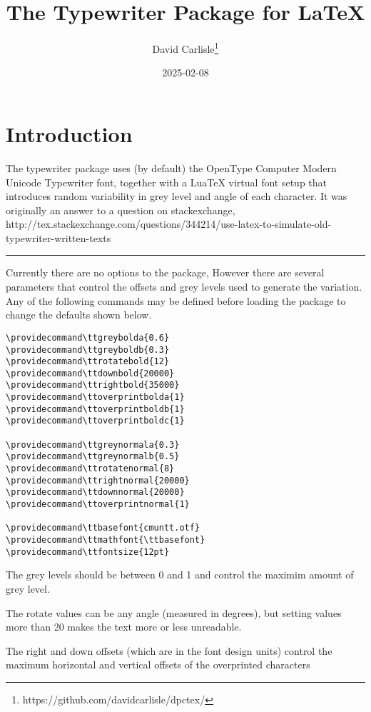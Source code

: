 \documentclass{article}
\providecommand\ttbasefont{QTAntiquePost.otf}
\providecommand\ttmathfont{cmuntt.otf}
\providecommand\ttoverprintnormal{0}
\providecommand\ttoverprintbolda{1}
\providecommand\ttoverprintboldb{0}
\providecommand\ttoverprintboldc{0}
\providecommand\ttgreynormala{0.5}
\begin{document}
\title{The Typewriter Package for LaTeX}
\author{David Carlisle\thanks{https://github.com/davidcarlisle/dpctex/}}
\date{2025-02-08}

\maketitle

\section{Introduction}
The typewriter package uses (by default) the OpenType Computer Modern Unicode
Typewriter font, together with a LuaTeX virtual font setup that
introduces random variability in grey level and angle of each
character. It was originally an answer to a question on stackexchange,
http://tex.stackexchange.com/questions/344214/use-latex-to-simulate-old-typewriter-written-texts


\hrule

Currently there are no options to the package, However there are several parameters that control the offsets
and grey levels used to generate the variation. Any of the following
commands may be defined before loading the package to change the defaults shown below.

\begin{verbatim}
\providecommand\ttgreybolda{0.6}
\providecommand\ttgreyboldb{0.3}
\providecommand\ttrotatebold{12}
\providecommand\ttdownbold{20000}
\providecommand\ttrightbold{35000}
\providecommand\ttoverprintbolda{1}
\providecommand\ttoverprintboldb{1}
\providecommand\ttoverprintboldc{1}

\providecommand\ttgreynormala{0.3}
\providecommand\ttgreynormalb{0.5}
\providecommand\ttrotatenormal{8}
\providecommand\ttrightnormal{20000}
\providecommand\ttdownnormal{20000}
\providecommand\ttoverprintnormal{1}

\providecommand\ttbasefont{cmuntt.otf}
\providecommand\ttmathfont{\ttbasefont}
\providecommand\ttfontsize{12pt}
\end{verbatim}

The grey levels should be between 0 and 1 and control the maximim
amount of grey level.

The rotate values can be any angle (measured in degrees), but setting
values more than 20 makes the text more or less unreadable.

The right and down offsets (which are in the font design units) control the
maximum horizontal and vertical offsets of the overprinted characters
\end{document}
